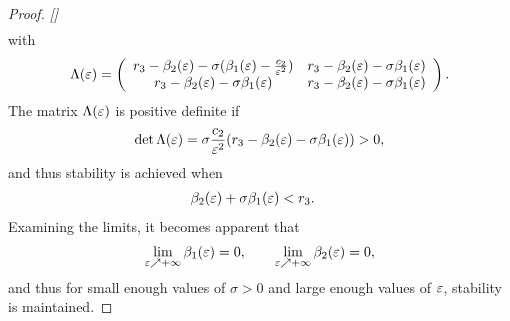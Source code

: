 \begin{proof}{\em []}
\begin{align}
  \end{align}
  with
  \begin{align}
    \Lambda(\varepsilon) = \left(\begin{array}{c c}
      r_{3} - \beta_{2}(\varepsilon) - \sigma (\beta_{1}(\varepsilon) - \frac{c_{2}}{\varepsilon^{2}}) & r_{3} - \beta_{2}(\varepsilon) - \sigma \beta_{1}(\varepsilon)\\
      r_{3} - \beta_{2}(\varepsilon) - \sigma \beta_{1}(\varepsilon) & r_{3} - \beta_{2}(\varepsilon) - \sigma \beta_{1}(\varepsilon)
    \end{array}\right).
  \end{align}
  The matrix $\Lambda(\varepsilon)$ is positive definite if
  \begin{align}
    \det \Lambda(\varepsilon) = \sigma\frac{c_{2}}{\varepsilon^{2}} (r_{3} - \beta_{2}(\varepsilon) - \sigma \beta_{1}(\varepsilon)) > 0,
  \end{align}
  and thus stability is achieved when
  \begin{align}
    &\beta_{2}(\varepsilon) + \sigma \beta_{1}(\varepsilon) < r_{3}.
  \end{align}
  Examining the limits, it becomes apparent that
  \begin{align}
    \nonumber
    \lim_{\varepsilon \nearrow +\infty} \beta_{1}(\varepsilon) = 0, \qquad \lim_{\varepsilon \nearrow +\infty} \beta_{2}(\varepsilon) = 0,
  \end{align}
  and thus for small enough values of $\sigma > 0$ and large enough values of $\varepsilon$, stability is maintained.
\end{proof}
